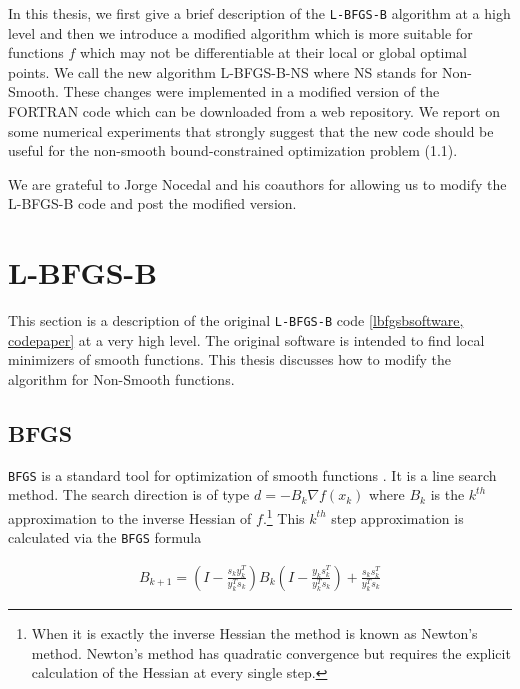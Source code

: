 In this thesis, we first give a brief description of the \texttt{L-BFGS-B} algorithm
at a high level and then we introduce a modified algorithm which
is more suitable for functions $f$ which may not be
differentiable at their local or global optimal points.  
We call the new algorithm L-BFGS-B-NS where NS stands for
Non-Smooth.  These changes were implemented in a modified version 
of the FORTRAN code \citep{lbfgsbNS} which can be downloaded from a web repository.  We report on some numerical experiments 
that strongly suggest that the new code should be useful for the
non-smooth bound-constrained optimization problem (1.1).

We are grateful to Jorge Nocedal and his coauthors for allowing us 
to modify the L-BFGS-B code and post the modified version.  

\chapter{L-BFGS-B}
\label{ChapterConstraints} %

This section is a description of the original \texttt{L-BFGS-B} code \eqref{lbfgsbsoftware, codepaper} at a very high level. The original software is intended to find local minimizers of smooth functions. This thesis discusses how to modify the algorithm for Non-Smooth functions.

\section{BFGS}

\texttt{BFGS} is a standard tool for optimization of smooth functions \citep{nocedal}. It is a line search method. The search direction is of type $d = -B_k \nabla f(x_k)$ where $B_k$ is the $k^{th}$ approximation to the inverse Hessian of $f$.\footnote{When it is exactly the inverse Hessian the method is known as Newton's method. Newton's method has quadratic convergence but requires the explicit calculation of the Hessian at every single step.} This $k^{th}$ step approximation is calculated via the \texttt{BFGS} formula

\begin{equation} \label{bfgsupdate}
  \begin{aligned}
    B_{k+1} = \left(I - \frac{s_ky_k^T}{y_k^Ts_k} \right) B_k \left( I - \frac{y_ks_k^T}{y_k^Ts_k} \right) + \frac{s_k s_k^T}{y_k^T s_k}
  \end{aligned}
\end{equation}

